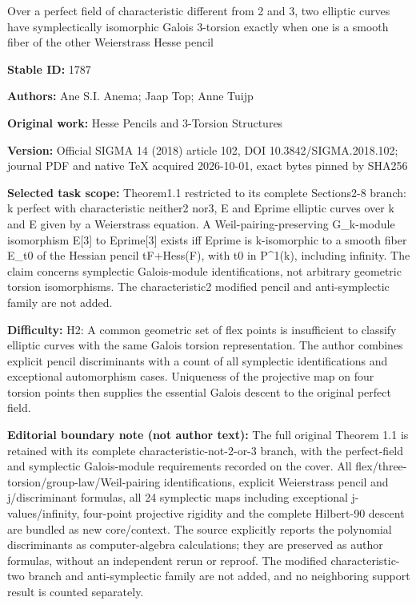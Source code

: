 \documentclass[11pt]{article}
\numberwithin{equation}{section}
\begin{document}
\begin{center}\Large Over a perfect field of characteristic different from 2 and 3, two elliptic curves have symplectically isomorphic Galois 3-torsion exactly when one is a smooth fiber of the other Weierstrass Hesse pencil\end{center}
\noindent\textbf{Stable ID:} 1787\par
\noindent\textbf{Authors:} Ane S.I. Anema; Jaap Top; Anne Tuijp\par
\noindent\textbf{Original work:} Hesse Pencils and 3-Torsion Structures\par
\noindent\textbf{Version:} Official SIGMA 14 (2018) article 102, DOI 10.3842/SIGMA.2018.102; journal PDF and native TeX acquired 2026-10-01, exact bytes pinned by SHA256\par
\noindent\textbf{Selected task scope:} Theorem1.1 restricted to its complete Sections2-8 branch: k perfect with characteristic neither2 nor3, E and Eprime elliptic curves over k and E given by a Weierstrass equation. A Weil-pairing-preserving G\_k-module isomorphism E[3] to Eprime[3] exists iff Eprime is k-isomorphic to a smooth fiber E\_t0 of the Hessian pencil tF+\allowbreak{}Hess(F), with t0 in P\textasciicircum{}1(k), including infinity. The claim concerns symplectic Galois-module identifications, not arbitrary geometric torsion isomorphisms. The characteristic2 modified pencil and anti-symplectic family are not added.\par
\noindent\textbf{Difficulty:} H2: A common geometric set of flex points is insufficient to classify elliptic curves with the same Galois torsion representation. The author combines explicit pencil discriminants with a count of all symplectic identifications and exceptional automorphism cases. Uniqueness of the projective map on four torsion points then supplies the essential Galois descent to the original perfect field.\par
\noindent\textbf{Editorial boundary note (not author text):} The full original Theorem 1.1 is retained with its complete characteristic-not-2-or-3 branch, with the perfect-field and symplectic Galois-module requirements recorded on the cover. All flex/three-torsion/group-law/Weil-pairing identifications, explicit Weierstrass pencil and j/discriminant formulas, all 24 symplectic maps including exceptional j-values/infinity, four-point projective rigidity and the complete Hilbert-90 descent are bundled as new core/context. The source explicitly reports the polynomial discriminants as computer-algebra calculations; they are preserved as author formulas, without an independent rerun or reproof. The modified characteristic-two branch and anti-symplectic family are not added, and no neighboring support result is counted separately.\par
\end{document}
